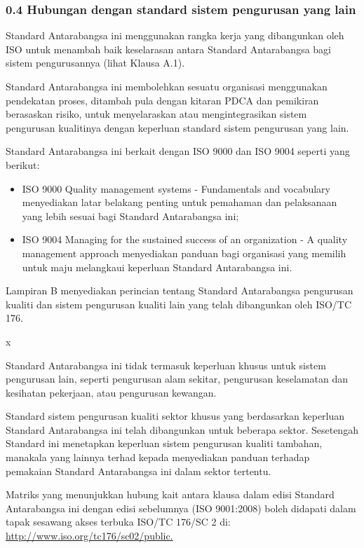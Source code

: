 \documentclass[
]{article}
\providecommand{\tightlist}{%
  \setlength{\itemsep}{0pt}\setlength{\parskip}{0pt}}
\begin{document}
\hypertarget{hubungan-dengan-standard-sistem-pengurusan-yang-lain}{%
\subsubsection{0.4 Hubungan dengan standard sistem pengurusan yang
lain}\label{hubungan-dengan-standard-sistem-pengurusan-yang-lain}}

Standard Antarabangsa ini menggunakan rangka kerja yang dibangunkan oleh
ISO untuk menambah baik keselarasan antara Standard Antarabangsa bagi
sistem pengurusannya (lihat Klausa A.1).

Standard Antarabangsa ini membolehkan sesuatu organisasi menggunakan
pendekatan proses, ditambah pula dengan kitaran PDCA dan pemikiran
berasaskan risiko, untuk menyelaraskan atau mengintegrasikan sistem
pengurusan kualitinya dengan keperluan standard sistem pengurusan yang
lain.

Standard Antarabangsa ini berkait dengan ISO 9000 dan ISO 9004 seperti
yang berikut:

\begin{itemize}
\tightlist
\item
  ISO 9000 Quality management systems - Fundamentals and vocabulary
  menyediakan latar belakang penting untuk pemahaman dan pelaksanaan
  yang lebih sesuai bagi Standard Antarabangsa ini;
\item
  ISO 9004 Managing for the sustained success of an organization - A
  quality management approach menyediakan panduan bagi organisasi yang
  memilih untuk maju melangkaui keperluan Standard Antarabangsa ini.
\end{itemize}

Lampiran B menyediakan perincian tentang Standard Antarabangsa
pengurusan kualiti dan sistem pengurusan kualiti lain yang telah
dibangunkan oleh ISO/TC 176.

x

Standard Antarabangsa ini tidak termasuk keperluan khusus untuk sistem
pengurusan lain, seperti pengurusan alam sekitar, pengurusan keselamatan
dan kesihatan pekerjaan, atau pengurusan kewangan.

Standard sistem pengurusan kualiti sektor khusus yang berdasarkan
keperluan Standard Antarabangsa ini telah dibangunkan untuk beberapa
sektor. Sesetengah Standard ini menetapkan keperluan sistem pengurusan
kualiti tambahan, manakala yang lainnya terhad kepada menyediakan
panduan terhadap pemakaian Standard Antarabangsa ini dalam sektor
tertentu.

Matriks yang menunjukkan hubung kait antara klausa dalam edisi Standard
Antarabangsa ini dengan edisi sebelumnya (ISO 9001:2008) boleh didapati
dalam tapak sesawang akses terbuka ISO/TC 176/SC 2 di:
\url{http://www.iso.org/tc176/sc02/public.}
\end{document}
